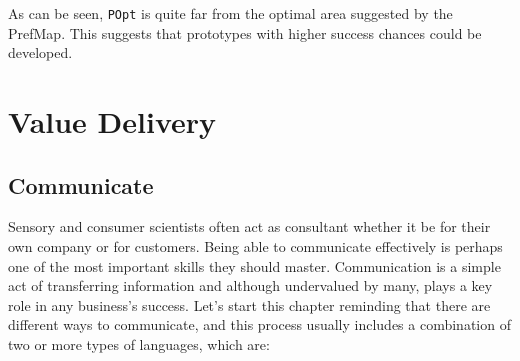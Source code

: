 \documentclass[
]{book}
\newenvironment{Shaded}{\begin{snugshade}}{\end{snugshade}}
\newcommand{\AttributeTok}[1]{\textcolor[rgb]{0.77,0.63,0.00}{#1}}
\newcommand{\DecValTok}[1]{\textcolor[rgb]{0.00,0.00,0.81}{#1}}
\newcommand{\FunctionTok}[1]{\textcolor[rgb]{0.00,0.00,0.00}{#1}}
\newcommand{\NormalTok}[1]{#1}
\newcommand{\SpecialCharTok}[1]{\textcolor[rgb]{0.00,0.00,0.00}{#1}}
\newcommand{\StringTok}[1]{\textcolor[rgb]{0.31,0.60,0.02}{#1}}
\begin{document}
\begin{Shaded}
\end{Shaded}

As can be seen, \texttt{POpt} is quite far from the optimal area suggested by the PrefMap. This suggests that prototypes with higher success chances could be developed.

\hypertarget{value-delivery}{%
\chapter{Value Delivery}\label{value-delivery}}

\hypertarget{communicate2}{%
\section{Communicate}\label{communicate2}}

Sensory and consumer scientists often act as consultant whether it be for their own company or for customers. Being able to communicate effectively is perhaps one of the most important skills they should master. Communication is a simple act of transferring information and although undervalued by many, plays a key role in any business's success. Let's start this chapter reminding that there are different ways to communicate, and this process usually includes a combination of two or more types of languages, which are:
\end{document}
